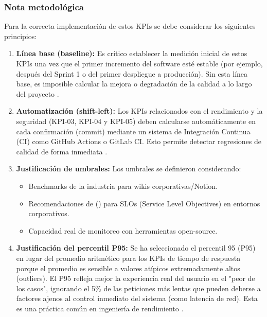 \documentclass[12pt]{article}
\begin{document}
\subsubsection*{Nota metodológica}

Para la correcta implementación de estos KPIs se debe considerar los siguientes principios:

\begin{enumerate}
    \item \textbf{Línea base (baseline):} Es crítico establecer la medición inicial de estos KPIs una vez que el primer incremento del software esté estable (por ejemplo, después del Sprint 1 o del primer despliegue a producción). Sin esta línea base, es imposible calcular la mejora o degradación de la calidad a lo largo del proyecto \cite{galin2018}.

    \item \textbf{Automatización (shift-left):} Los KPIs relacionados con el rendimiento y la seguridad (KPI-03, KPI-04 y KPI-05) deben calcularse automáticamente en cada confirmación (commit) mediante un sistema de Integración Continua (CI) como GitHub Actions o GitLab CI. Esto permite detectar regresiones de calidad de forma inmediata \cite{forsgren2018}.

    \item \textbf{Justificación de umbrales:} Los umbrales se definieron considerando:
    \begin{itemize}
        \item Benchmarks de la industria para wikis corporativas/Notion.
        \item Recomendaciones de \citeauthor{galin2018} (\citeyear{galin2018}) para SLOs (Service Level Objectives) en entornos corporativos.
        \item Capacidad real de monitoreo con herramientas open-source.
    \end{itemize}

    \item \textbf{Justificación del percentil P95:} Se ha seleccionado el percentil 95 (P95) en lugar del promedio aritmético para los KPIs de tiempo de respuesta porque el promedio es sensible a valores atípicos extremadamente altos (outliers). El P95 refleja mejor la experiencia real del usuario en el "peor de los casos", ignorando el 5\% de las peticiones más lentas que pueden deberse a factores ajenos al control inmediato del sistema (como latencia de red). Esta es una práctica común en ingeniería de rendimiento \cite{pressman2020}.
\end{enumerate}
\end{document}
